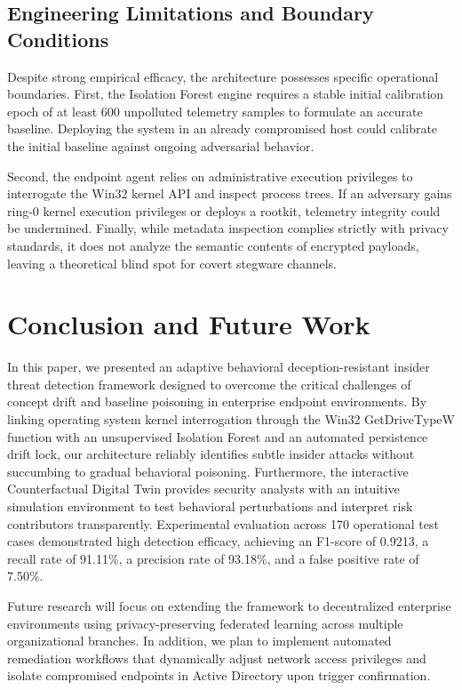 \documentclass[conference]{IEEEtran}
\begin{document}
\subsection{Engineering Limitations and Boundary Conditions}
Despite strong empirical efficacy, the architecture possesses specific operational boundaries. First, the Isolation Forest engine requires a stable initial calibration epoch of at least 600 unpolluted telemetry samples to formulate an accurate baseline. Deploying the system in an already compromised host could calibrate the initial baseline against ongoing adversarial behavior.

Second, the endpoint agent relies on administrative execution privileges to interrogate the Win32 kernel API and inspect process trees. If an adversary gains ring-0 kernel execution privileges or deploys a rootkit, telemetry integrity could be undermined. Finally, while metadata inspection complies strictly with privacy standards, it does not analyze the semantic contents of encrypted payloads, leaving a theoretical blind spot for covert stegware channels.

\section{Conclusion and Future Work}
In this paper, we presented an adaptive behavioral deception-resistant insider threat detection framework designed to overcome the critical challenges of concept drift and baseline poisoning in enterprise endpoint environments. By linking operating system kernel interrogation through the Win32 GetDriveTypeW function with an unsupervised Isolation Forest and an automated persistence drift lock, our architecture reliably identifies subtle insider attacks without succumbing to gradual behavioral poisoning. Furthermore, the interactive Counterfactual Digital Twin provides security analysts with an intuitive simulation environment to test behavioral perturbations and interpret risk contributors transparently. Experimental evaluation across 170 operational test cases demonstrated high detection efficacy, achieving an F1-score of 0.9213, a recall rate of 91.11\%, a precision rate of 93.18\%, and a false positive rate of 7.50\%.

Future research will focus on extending the framework to decentralized enterprise environments using privacy-preserving federated learning across multiple organizational branches. In addition, we plan to implement automated remediation workflows that dynamically adjust network access privileges and isolate compromised endpoints in Active Directory upon trigger confirmation.
\end{document}
